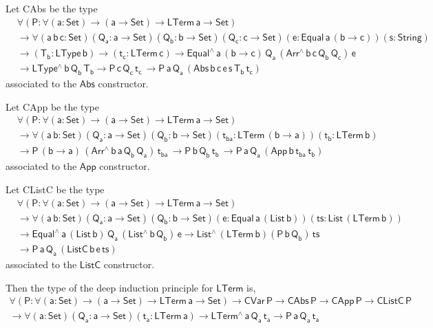 \documentclass[acmsmall,screen,review,anonymous]{acmart}
\theoremstyle{definition}
\begin{document}
Let CAbs be the type 
\begin{align*}
  &\mathsf{\forall (P : \forall (a : Set) \to (a \to Set) \to LTerm\,a \to Set)} \\
  &\mathsf{\to 
  \forall (a \,b\, c: Set) (Q_a : a \to Set)  (Q_b : b \to Set) (Q_c : c \to Set)
  (e : Equal\, a\, (b \to c)) (s : String) } \\ 
  &\mathsf{ \to (T_b : LType\, b) \to (t_c : LTerm\, c)
  \to Equal^{\wedge}\,a\,(b \to c)\, Q_a \, (Arr^{\wedge} \, b\, c\, Q_b \, Q_c) \, e
  } \\
  &\mathsf{
  \to LType^{\wedge}\, b\, Q_b\, T_b
  \to P\, c\, Q_c\, t_c\, 
  \to P \, a\, Q_a\, (Abs \,b \,c \, e \,s \,T_b \, t_c)
  }
\end{align*}
associated to the $\mathsf{Abs}$ constructor. 


Let CApp be the type 
\begin{align*}
  &\mathsf{\forall (P : \forall (a : Set) \to (a \to Set) \to LTerm\,a \to Set)} \\
  &\mathsf{\to 
  \forall (a \,b : Set) (Q_a : a \to Set)  (Q_b : b \to Set) 
   (t_{ba} : LTerm\, (b \to a)) (t_b : LTerm\, b)} \\
  &\mathsf{
  \to P\, (b \to a)\, (Arr^{\wedge} \, b\, a\, Q_b \, Q_a) \, t_{ba} \, 
  \to P\, b\, Q_b\, t_b\, 
  \to P \, a\, Q_a\, (App \,b \,t_{ba} \, t_b) }
\end{align*}
associated to the $\mathsf{App}$ constructor. 

Let CListC be the type 
\begin{align*}
  &\mathsf{\forall (P : \forall (a : Set) \to (a \to Set) \to LTerm\,a \to Set)} \\
  &\mathsf{\to 
  \forall (a \,b : Set) (Q_a : a \to Set)  (Q_b : b \to Set) 
    (e : Equal\, a\, (List\, b)) (ts : List\, (LTerm\, b))} \\ 
  &\mathsf{
    \to Equal^{\wedge}\, a\, (List\,b)\, Q_a\, (List^{\wedge}\, b\, Q_b)\, e 
  \to List^{\wedge}\, (LTerm\,b) (P\, b\, Q_b)\, ts} \\
&\mathsf{
  \to P \, a\, Q_a\, (ListC \,b \,e \, ts) }
\end{align*}
associated to the $\mathsf{ListC}$ constructor. 

Then the type of the deep induction principle for $\mathsf{LTerm}$ is,
\begin{multline*}
\mathsf{\forall (P : \forall (a : Set) \to (a \to Set) \to LTerm\,a \to Set)}
\mathsf{\to CVar\,P \to CAbs\,P \to CApp\,P \to CListC\,P} \\
\mathsf{\to \forall (a : Set)(Q_a : a \to Set)(t_a : LTerm\,a) \to LTerm^{\wedge}\,a\,Q_a\,t_a \to P\,a\,Q_a\,t_a}
\end{multline*}
\end{document}
